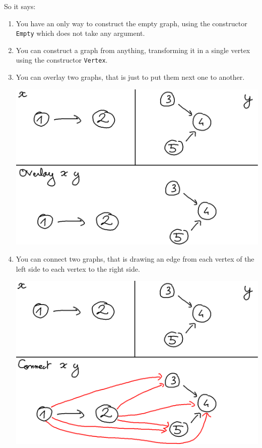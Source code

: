\documentclass[10pt,a4paper]{article}
\begin{document}
So it says:

\begin{enumerate}
\item You have an only way to construct the empty graph, using the constructor \verb|Empty| which does not take any argument.

\item You can construct a graph from anything, transforming it in a single vertex using the constructor \verb|Vertex|.

\item You can overlay two graphs, that is just to put them next one to another.

\begin{center}
	\includegraphics[scale=0.4]{figspng/overlay.png}
\end{center}

\item You can connect two graphs, that is drawing an edge from each vertex of the left side to each vertex to the right side.

\begin{center}
	\includegraphics[scale=0.4]{figspng/connect.png}
\end{center}

\end{enumerate}
\end{document}
